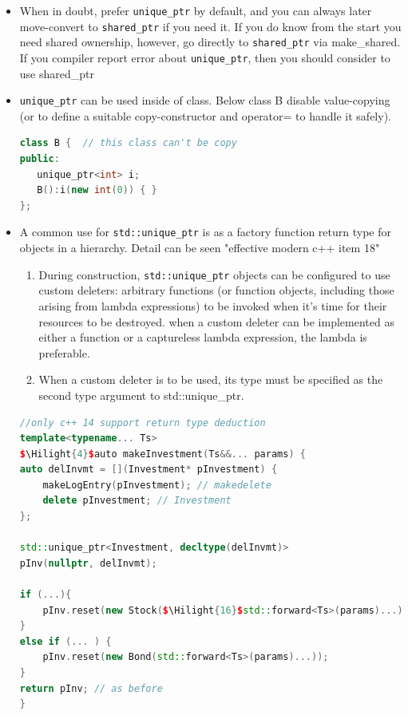 \documentclass[a4paper,11pt,twoside]{book}
\newcommand{\Hilight}[1]{\makebox[0pt][l]{\color{yellow}\rule[-3pt]{#1em}{11pt}}}
\newcommand{\Hilight}[1]{}
\begin{document}
\begin{itemize}
\item When in doubt, prefer \texttt{unique\_ptr} by default, and you can always later move-convert to \texttt{shared\_ptr} if you need it. If you do know from the start you need shared ownership, however, go directly to \texttt{shared\_ptr} via make\_shared. If you compiler report error about \texttt{unique\_ptr}, then you should consider to use shared\_ptr

\item \texttt{unique\_ptr} can be used inside of class. Below class B disable value-copying (or to define a suitable copy-constructor  and operator= to handle it safely).
\begin{lstlisting}[frame=single, language=c++]
class B {  // this class can't be copy
public:
   unique_ptr<int> i;
   B():i(new int(0)) { }
};
\end{lstlisting}

\item A common use for \texttt{std::unique\_ptr} is as a factory function return type for objects
in a hierarchy. Detail can be seen "effective modern c++ item 18"

\begin{enumerate}
\item During construction, \texttt{std::unique\_ptr} objects can be configured to use custom deleters: arbitrary functions (or function objects, including those arising from lambda expressions) to be invoked when it's time for their resources to be destroyed. when a custom deleter can be implemented as either a function or a captureless lambda expression, the lambda is preferable.

\item When a custom deleter is to be used, its type must be specified as the second type argument to std::unique\_ptr.
\end{enumerate}

\begin{lstlisting}[frame=single, language=c++, mathescape=true]
//only c++ 14 support return type deduction
template<typename... Ts>
$\Hilight{4}$auto makeInvestment(Ts&&... params) {
auto delInvmt = [](Investment* pInvestment) {
	makeLogEntry(pInvestment); // makedelete
	delete pInvestment; // Investment
};

std::unique_ptr<Investment, decltype(delInvmt)>
pInv(nullptr, delInvmt);

if (...){
	pInv.reset(new Stock($\Hilight{16}$std::forward<Ts>(params)...));
}
else if (... ) {
	pInv.reset(new Bond(std::forward<Ts>(params)...));
}
return pInv; // as before
}
\end{lstlisting}


\end{itemize}
\end{document}
